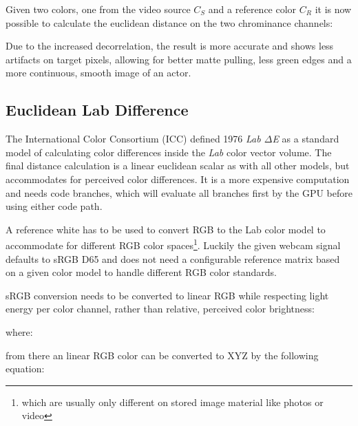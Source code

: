 Given two colors, one from the video source $C_S$ and a reference color $C_R$ 
it is now possible to calculate the euclidean distance on the two chrominance 
channels:


Due to the increased decorrelation, the result is more accurate and shows less 
artifacts on target pixels, allowing for better matte pulling, less 
green edges and a more continuous, smooth image of an actor.

\subsection{Euclidean Lab Difference}
The International Color Consortium (ICC) defined 1976 \textit{Lab $\Delta$E} as 
a standard model of calculating color differences inside the \textit{Lab} color 
vector volume. The final distance calculation is a linear euclidean scalar as 
with all other models, but accommodates for perceived color differences. It is 
a more expensive computation and needs code branches, which will evaluate all 
branches first by the GPU before using either code path.

A reference white has to be used to convert RGB to the Lab color model to 
accommodate for different RGB color spaces\footnote{which are usually only 
different on stored image material like photos or video}. Luckily the given 
webcam signal defaults to sRGB D65 and does not need a configurable reference 
matrix based on a given color model to handle different RGB color standards.

sRGB conversion needs to be converted to linear RGB while respecting light 
energy per color channel, rather than relative, perceived color brightness: 


where: 


from there an linear RGB color can be converted to XYZ by the following 
equation:


